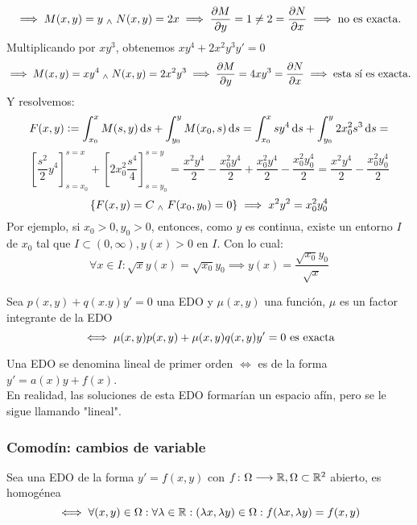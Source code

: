 \begin{ejem}[$y+2xy'=0$]
    \[\implies M(x, y)=y \; _{\wedge} \; N(x,y) = 2x \implies \pdv{M}{y}=1 \ne 2 = \pdv{N}{x} \implies \text{no es exacta.}\]
    Multiplicando por $xy^3$, obtenemos $xy^4+2x^2y^3y'=0$
    \[\implies M(x, y)=xy^4 \; _{\wedge} \; N(x,y)=2x^2y^3 \implies \pdv{M}{y}=4xy^3 = \pdv{N}{x}\implies \text{esta sí es exacta.}\]
    Y resolvemos:
    \[F(x, y)\defeq \int_{x_0}^xM(s,y)\odif{s}+\int_{y_0}^yM(x_0,s)\odif{s} = \int_{x_0}^xsy^4\odif{s}+\int_{y_0}^y2x_0^2s^3\odif{s}=\]
    \[\left[\frac{s^2}{2}y^4\right]_{s=x_0}^{s=x} + \left[2x_0^2\frac{s^4}{4}\right]_{s=y_0}^{s=y}=\frac{x^2y^4}{2}-\frac{x_0^2y^4}{2}+\frac{x_0^2y^4}{2}-\frac{x_0^2y_0^4}{2}=\frac{x^2y^4}{2}-\frac{x_0^2y_0^4}{2}\]
    \[\{F(x,y)=C \; _{\wedge} \; F(x_0, y_0)=0\} \implies x^2y^2=x_0^2y_0^4\]
    Por ejemplo, si $x_0>0, y_0>0$, entonces, como $y$ es continua, existe un entorno $I$ de $x_0$ tal que $I\subset (0, \infty), y(x)>0$ en $I$. Con lo cual:
    \[\forall x \in I : \sqrt{x}y(x)=\sqrt{x_0}y_0 \implies \boxed{y(x)=\frac{\sqrt{x_0}y_0}{\sqrt{x}}}\]
\end{ejem}

\begin{defn}
    Sea $p(x,y) + q(x.y)y'=0$ una EDO y $\mu(x,y)$ una función, $\mu$ es un factor integrante de la EDO
    \[\iff \mu(x,y)p(x,y)+\mu(x,y)q(x,y)y'=0 \text{ es exacta}\]
\end{defn}
\begin{defn}
    Una EDO se denomina lineal de primer orden $\iff$ es de la forma $y'=a(x)y+f(x)$. \\
    \indent En realidad, las soluciones de esta EDO formarían un espacio afín, pero se le sigue llamando "lineal".
\end{defn}
\subsubsection{Comodín: cambios de variable}
\begin{defn}
    Sea una EDO de la forma $y'=f(x,y)$ con $f \colon \Omega \longrightarrow \mathbb{R}, \Omega \subset \mathbb{R}^2$ abierto, es homogénea
    \[\iff \forall (x, y) \in \Omega : \forall \lambda\in \mathbb{R} : (\lambda x, \lambda y) \in \Omega : f(\lambda x, \lambda y) = f(x,y)\]
\end{defn}

